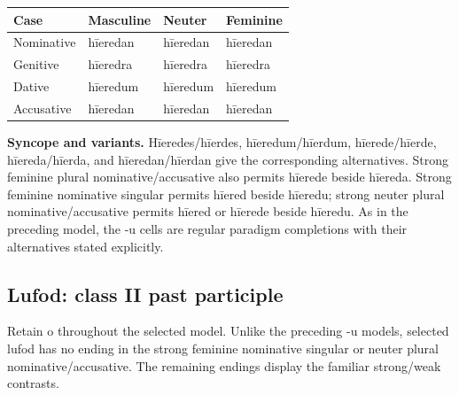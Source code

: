 \par\begingroup
\fontsize{10.5}{13.2}\selectfont
\setlength{\LTleft}{0pt}\setlength{\LTright}{\fill}
\noindent
\begin{tabular}{@{}>{\raggedright\arraybackslash}p{22.0mm}>{\raggedright\arraybackslash}p{31.188mm}>{\raggedright\arraybackslash}p{31.188mm}>{\raggedright\arraybackslash}p{31.188mm}@{}}
\toprule
\textbf{Case} & \textbf{Masculine} & \textbf{Neuter} & \textbf{Feminine} \\
\midrule
Nominative & hīeredan & hīeredan & hīeredan \\
Genitive & hīeredra & hīeredra & hīeredra \\
Dative & hīeredum & hīeredum & hīeredum \\
Accusative & hīeredan & hīeredan & hīeredan \\
\bottomrule
\end{tabular}
\par\endgroup
\textbf{Syncope and variants.} Hīeredes/\allowbreak{}hīerdes, hīeredum/\allowbreak{}hīerdum, hīerede/\allowbreak{}hīerde, hīereda/\allowbreak{}hīerda, and hīeredan/\allowbreak{}hīerdan give the corresponding alternatives. Strong feminine plural nominative/\allowbreak{}accusative also permits hīerede beside hīereda. Strong feminine nominative singular permits hīered beside hīeredu; strong neuter plural nominative/\allowbreak{}accusative permits hīered or hīerede beside hīeredu. As in the preceding model, the -u cells are regular paradigm completions with their alternatives stated explicitly.

\subsection*{Lufod: class II past participle}

Retain o throughout the selected model. Unlike the preceding -u models, selected lufod has no ending in the strong feminine nominative singular or neuter plural nominative/\allowbreak{}accusative. The remaining endings display the familiar strong/\allowbreak{}weak contrasts.

